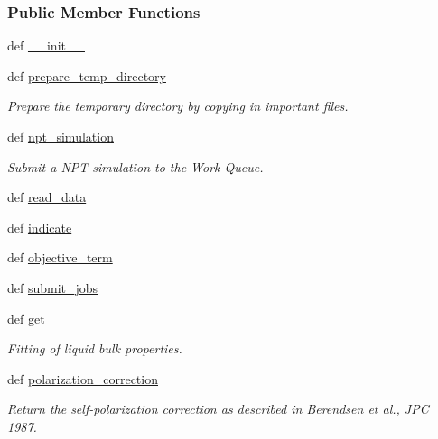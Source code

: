 \subsubsection*{Public Member Functions}
\begin{DoxyCompactItemize}
\item 
def \hyperlink{classforcebalance_1_1tinkerio_1_1Liquid__TINKER_a307529b9902b34a790a8b016e153c7d6}{\-\_\-\-\_\-init\-\_\-\-\_\-}
\item 
def \hyperlink{classforcebalance_1_1tinkerio_1_1Liquid__TINKER_ad07e4415104e2695d6b6557e2755c7dd}{prepare\-\_\-temp\-\_\-directory}
\begin{DoxyCompactList}\small\item\em Prepare the temporary directory by copying in important files. \end{DoxyCompactList}\item 
def \hyperlink{classforcebalance_1_1tinkerio_1_1Liquid__TINKER_a53a10ac99cdfbf026526ed625d4de809}{npt\-\_\-simulation}
\begin{DoxyCompactList}\small\item\em Submit a N\-P\-T simulation to the Work Queue. \end{DoxyCompactList}\item 
def \hyperlink{classforcebalance_1_1liquid_1_1Liquid_a08b698af913d56f780d0587821c922cd}{read\-\_\-data}
\item 
def \hyperlink{classforcebalance_1_1liquid_1_1Liquid_ae94ce30dfd0e92fdd6d746e6743be844}{indicate}
\item 
def \hyperlink{classforcebalance_1_1liquid_1_1Liquid_a00c23db61bcb86cc19f79dacdb2bc1f3}{objective\-\_\-term}
\item 
def \hyperlink{classforcebalance_1_1liquid_1_1Liquid_a716e28bb5572b3273036ac753b7e1e1d}{submit\-\_\-jobs}
\item 
def \hyperlink{classforcebalance_1_1liquid_1_1Liquid_a802c4139e5c002fabdeab5de88093880}{get}
\begin{DoxyCompactList}\small\item\em Fitting of liquid bulk properties. \end{DoxyCompactList}\item 
def \hyperlink{classforcebalance_1_1liquid_1_1Liquid_a51ea9d9fb4418ec2497fe8e2d8033d41}{polarization\-\_\-correction}
\begin{DoxyCompactList}\small\item\em Return the self-\/polarization correction as described in Berendsen et al., J\-P\-C 1987. \end{DoxyCompactList}\item 

\end{DoxyCompactItemize}
